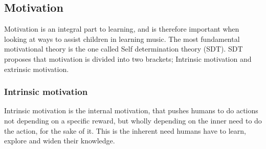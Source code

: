 \subsection{Motivation}
Motivation is an integral part to learning\cite{motivationGameDesign}, and is therefore important when looking at ways to assist children in learning music. The most fundamental motivational theory is the one called Self determination theory (SDT)\cite{SDT}. SDT proposes that motivation is divided into two brackets; Intrinsic motivation and extrinsic motivation\cite{SDT}. 

\subsubsection*{Intrinsic motivation}
Intrinsic motivation is the internal motivation, that pushes humans to do actions not depending on a specific reward, but wholly depending on the inner need to do the action, for the sake of it\cite{SDT}.
This is the inherent need humans have to learn, explore and widen their knowledge\cite{SDT}.\\

